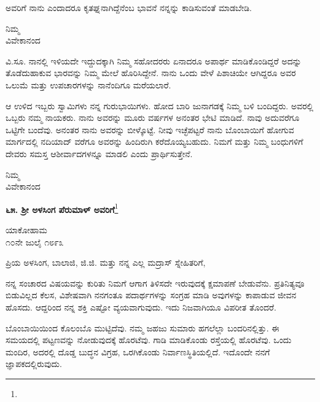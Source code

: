 ಅವರಿಗೆ ನಾನು ಎಂದಾದರೂ ಕೃತಘ್ನನಾಗಿದ್ದೆನೆಂಬ ಭಾವನೆ ನನ್ನನ್ನು ಕಾಡಿಸುವಂತೆ ಮಾಡಬೇಡಿ.

\vspace{-0.55cm}

{\flushright
ನಿಮ್ಮ\\ವಿವೇಕಾನಂದ\par}

ವಿ.ಸೂ. \enginline{-} ನಾನಲ್ಲಿ ಇಳಿಯದೇ ಇದ್ದುದಕ್ಕಾಗಿ ನಿಮ್ಮ ಸಹೋದರರು ಏನಾದರೂ ಅಪಾರ್ಥ ಮಾಡಿಕೊಂಡಿದ್ದರೆ ಅದನ್ನು ತೊಡೆದುಹಾಕುವ ಭಾರವನ್ನು ನಿಮ್ಮ ಮೇಲೆ ಹೊರಿಸಿದ್ದೇನೆ. ನಾನು ಒಂದು ವೇಳೆ ಪಿಶಾಚಿಯೇ ಆಗಿದ್ದರೂ ಅವರ ಒಲುಮೆ ಮತ್ತು ಉಪಚಾರಗಳನ್ನು ನಾನೆಂದಿಗೂ ಮರೆಯಲಾರೆ.

ಆ ಉಳಿದ ಇಬ್ಬರು ಸ್ವಾಮಿಗಳು ನನ್ನ ಗುರುಭಾಯಿಗಳು. ಹೋದ ಬಾರಿ ಜುನಾಗಡಕ್ಕೆ ನಿಮ್ಮ ಬಳಿ ಬಂದಿದ್ದರು. ಅವರಲ್ಲಿ ಒಬ್ಬರು ನಮ್ಮ ನಾಯಕರು. ನಾನು ಅವರನ್ನು ಮೂರು ವರ್ಷಗಳ ಅನಂತರ ಭೇಟಿ ಮಾಡಿದೆ. ನಾವು ಅದುವರೆಗೂ ಒಟ್ಟಿಗೇ ಬಂದೆವು. ಅನಂತರ ನಾನು ಅವರನ್ನು ಬೀಳ್ಕೊಟ್ಟೆ. ನೀವು ಇಚ್ಛೆಪಟ್ಟರೆ ನಾನು ಬೊಂಬಾಯಿಗೆ ಹೋಗುವ ಮಾರ್ಗದಲ್ಲಿ ನದಿಯಾದ್ ವರೆಗೂ ಅವರನ್ನು ಹಿಂದಿರುಗಿ ಕರೆದೊಯ್ಯಬಹುದು. ನಿಮಗೆ ಮತ್ತು ನಿಮ್ಮ ಬಂಧುಗಳಿಗೆ ದೇವರು ಸಮಸ್ತ ಆಶೀರ್ವಾದಗಳನ್ನೂ ಮಾಡಲಿ ಎಂದು ಪ್ರಾರ್ಥಿಸುತ್ತೇನೆ.


{\flushright
ನಿಮ್ಮ\\ವಿವೇಕಾನಂದ\par}

\begin{center}
\textbf{೬೫. ಶ‍್ರೀ ಅಳಸಿಂಗ ಪೆರುಮಾಳ್ ಅವರಿಗೆ}\footnote{}
\end{center}


\begin{flushright}
ಯಾಕೋಹಾಮ\\೧೦ನೇ ಜುಲೈ ೧೮೯೩
\end{flushright}

\noindent
ಪ್ರಿಯ ಅಳಸಿಂಗ, ಬಾಲಾಜಿ, ಜಿ.ಜಿ. ಮತ್ತು ನನ್ನ ಎಲ್ಲ ಮದ್ರಾಸ್ ಸ್ನೇಹಿತರಿಗೆ,

ನನ್ನ ಸಂಚಾರದ ವಿಷಯವನ್ನು ಕುರಿತು ನಿಮಗೆ ಆಗಾಗ ತಿಳಿಸದೇ ಇರುವುದಕ್ಕೆ ಕ್ಷಮಾಪಣೆ ಬೇಡುವೆನು. ಪ್ರತಿನಿತ್ಯವೂ ಬಿಡುವಿಲ್ಲದ ಕೆಲಸ, ವಿಶೇಷವಾಗಿ ನನಗಂತೂ ಪದಾರ್ಥಗಳನ್ನು ಸಂಗ್ರಹ ಮಾಡಿ ಅವುಗಳನ್ನು ಕಾಪಾಡುವ ಜೀವನ ಹೊಸದು. ಆದ್ದರಿಂದ ನನ್ನ ಶಕ್ತಿ ಎಷ್ಟೋ ವ್ಯಯವಾಗುವುದು. ಇದು ನಿಜವಾಗಿಯೂ ವಿಪರೀತ ತೊಂದರೆ.

ಬೊಂಬಾಯಿಯಿಂದ ಕೊಲಂಬೊ ಮುಟ್ಟಿದೆವು. ನಮ್ಮ ಜಹಜು ಸುಮಾರು ಹಗಲೆಲ್ಲಾ ಬಂದರಿನಲ್ಲಿತ್ತು. ಈ ಸಮಯದಲ್ಲಿ ಪಟ್ಟಣವನ್ನು ನೋಡುವುದಕ್ಕೆ ಹೊರಟೆವು. ಗಾಡಿ ಮಾಡಿಕೊಂಡು ರಸ್ತೆಯಲ್ಲಿ ಹೊರಟೆವು. ಒಂದು ಮಂದಿರ, ಅದರಲ್ಲಿ ದೊಡ್ಡ ಬುದ್ಧನ ವಿಗ್ರಹ, ಒರಗಿಕೊಂಡು ನಿರ್ವಾಣಸ್ಥಿತಿಯಲ್ಲಿದೆ. ಇದೊಂದೇ ನನಗೆ ಜ್ಞಾಪಕದಲ್ಲಿರುವುದು.

